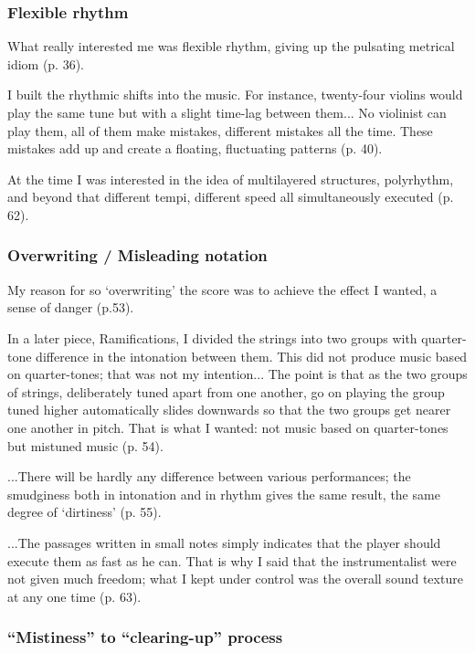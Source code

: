 \documentclass[a4paper,11pt]{article}
\begin{document}
\subsubsection{Flexible rhythm}
\label{subs:ligeti:flexible}

What really interested me was flexible rhythm, giving up the pulsating metrical idiom (p. 36).

I built the rhythmic shifts into the music.
For instance, twenty-four violins would play the same tune but with a slight time-lag between them...
No violinist can play them, all of them make mistakes, different mistakes all the time.
These mistakes add up and create a floating, fluctuating patterns (p. 40).

At the time I was interested in the idea of multilayered structures, polyrhythm, and beyond that different tempi, different speed all simultaneously executed (p. 62).

\subsubsection{Overwriting / Misleading notation}
\label{subs:ligeti:overwriting}

My reason for so ‘overwriting’ the score was to achieve the effect I wanted, a sense of danger (p.53).

In a later piece, Ramifications, I divided the strings into two groups with quarter-tone difference in the intonation between them.
This did not produce music based on quarter-tones; that was not my intention...
The point is that as the two groups of strings, deliberately tuned apart from one another, go on playing the group tuned higher automatically slides downwards so that the two groups get nearer one another in pitch.
That is what I wanted: not music based on quarter-tones but mistuned music (p. 54).

...There will be hardly any difference between various performances; the smudginess both in intonation and in rhythm gives the same result, the same degree of ‘dirtiness’ (p. 55).

...The passages written in small notes simply indicates that the player should execute them as fast as he can.
That is why I said that the instrumentalist were not given much freedom; what I kept under control was the overall sound texture at any one time (p. 63).

\subsubsection{``Mistiness'' to ``clearing-up'' process}
\label{subs:ligeti:mistiness}
\end{document}
